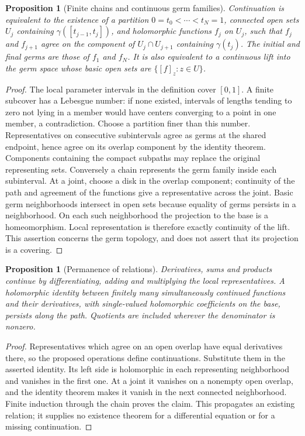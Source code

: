 \documentclass[11pt,a4paper,openany]{book}
\newtheorem{proposition}[theorem]{Proposition}
\theoremstyle{definition}
\theoremstyle{remark}\newtheorem{remark}[theorem]{Remark}
\newcommand{\family}[1]{}
\begin{document}
\begin{proposition}[Finite chains and continuous germ families]\label{d12:19-02}\family{D12.19.02}
Continuation is equivalent to the existence of a partition
$0=t_0<\cdots<t_N=1$, connected open sets $U_j$ containing
$\gamma([t_{j-1},t_j])$, and holomorphic functions $f_j$ on $U_j$, such
that $f_j$ and $f_{j+1}$ agree on the component of $U_j\cap U_{j+1}$
containing $\gamma(t_j)$. The initial and final germs are those of $f_1$
and $f_N$. It is also equivalent to a continuous lift into the germ space
whose basic open sets are $\{[f]_z:z\in U\}$.
\end{proposition}
\begin{proof}
The local parameter intervals in the definition cover $[0,1]$. A finite
subcover has a Lebesgue number: if none existed, intervals of lengths
tending to zero not lying in a member would have centers converging to a
point in one member, a contradiction. Choose a partition finer than this
number. Representatives on consecutive subintervals agree as germs at
the shared endpoint, hence agree on its overlap component by the identity
theorem. Components containing the compact subpaths may replace the
original representing sets. Conversely a chain represents the germ family
inside each subinterval. At a joint, choose a disk in the overlap component;
continuity of the path and agreement of the functions give a representative
across the joint. Basic germ neighborhoods intersect in open sets because
equality of germs persists in a neighborhood. On each such neighborhood
the projection to the base is a homeomorphism. Local representation is
therefore exactly continuity of the lift. This assertion concerns the germ
topology, and does not assert that its projection is a covering.
\end{proof}

\begin{proposition}[Permanence of relations]\label{d12:19-03}\family{D12.19.03}
Derivatives, sums and products continue by differentiating, adding and
multiplying the local representatives. A holomorphic identity between
finitely many simultaneously continued functions and their derivatives,
with single-valued holomorphic coefficients on the base, persists along
the path. Quotients are included wherever the denominator is nonzero.
\end{proposition}
\begin{proof}
Representatives which agree on an open overlap have equal derivatives
there, so the proposed operations define continuations. Substitute them
in the asserted identity. Its left side is holomorphic in each representing
neighborhood and vanishes in the first one. At a joint it vanishes on a
nonempty open overlap, and the identity theorem makes it vanish in the
next connected neighborhood. Finite induction through the chain proves
the claim. This propagates an existing relation; it supplies no existence
theorem for a differential equation or for a missing continuation.
\end{proof}
\end{document}
